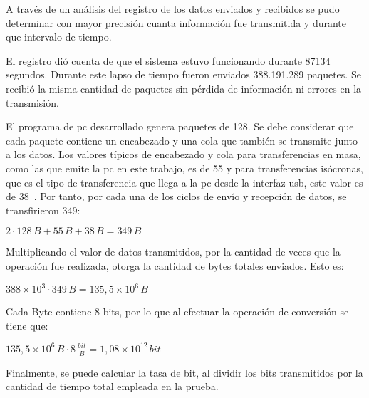 A través de un análisis del registro de los datos enviados y recibidos se pudo determinar con mayor precisión cuanta información fue transmitida y durante que intervalo de tiempo.

El registro dió cuenta de que el sistema estuvo funcionando durante 87134 segundos.
Durante este lapso de tiempo fueron enviados 388.191.289 paquetes. Se recibió la misma cantidad de paquetes sin pérdida de información ni errores en la transmisión. 

El programa de \acrshort{pc} desarrollado genera paquetes de \SI{128}{\byte}. Se debe considerar que cada paquete contiene un encabezado y una cola que también se transmite junto a los datos. Los valores típicos de encabezado y cola para transferencias en masa, como las que emite la \acrshort{pc} en este trabajo, es de \SI{55}{\byte} y para transferencias isócronas, que es el tipo de transferencia que llega a la \acrshort{pc} desde la interfaz \acrshort{usb}, este valor es de \SI{38}{\byte}~\cite{USBspec}. Por tanto, por cada una de los ciclos de envío y recepción de datos, se transfirieron \SI{349}{\byte}:

\begin{center}
	\begin{math}
		2 \cdot 128\,B + 55\,B + 38\,B = 349\,B 
	\end{math}
\end{center}

Multiplicando el valor de datos transmitidos, por la cantidad de veces que la operación fue realizada, otorga la cantidad de bytes totales enviados. Esto es:

\begin{center}
	\begin{math}
		388\times 10^3 \cdot 349\,B = 135,5\times 10^6\,B
	\end{math}
\end{center}

Cada Byte contiene 8 bits, por lo que al efectuar la operación de conversión se tiene que:

\begin{center}
	\begin{math}
		135,5\times 10^6\,B \cdot 8\,\frac{\displaystyle bit}{\displaystyle B} = 1,08\times 10^{12}\,bit
	\end{math}
\end{center}

Finalmente, se puede calcular la tasa de bit, al dividir los bits transmitidos por la cantidad de tiempo total empleada en la prueba. 

